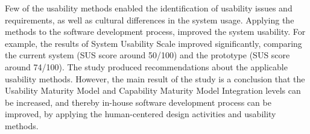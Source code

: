 \documentclass[12pt,a4paper,oneside,pdftex]{report}
\begin{document}
{Few of the usability methods enabled the identification of usability issues and requirements, as well as cultural differences in the system usage. Applying the methods to the software development process, improved the system usability. For example, the results of System Usability Scale improved significantly, comparing the current system (SUS score around 50/100) and the prototype (SUS score around 74/100). The study produced recommendations about the applicable usability methods. However, the main result of the study is a conclusion that the Usability Maturity Model and Capability Maturity Model Integration levels can be increased, and thereby in-house software development process can be improved, by applying the human-centered design activities and usability methods. 
}
\end{document}
